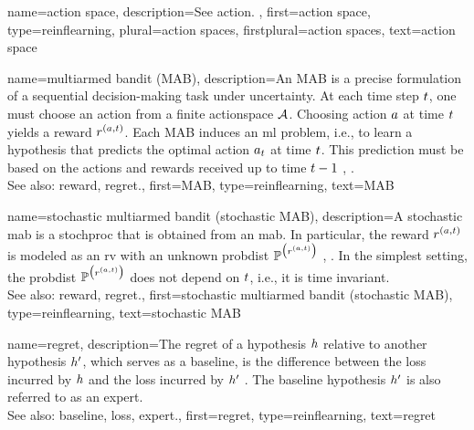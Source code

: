 {name={action space},
	description={See \gls{action}.} ,
	first={action space},
	type=reinflearning,
	plural={action spaces},
	firstplural={action spaces},
	text={action space}
}

{name={multiarmed bandit (MAB)},
	description={An MAB is a precise 
		formulation of a sequential decision-making task under \gls{uncertainty}. 
		At each time step $t$, one must choose an \gls{action} from a finite 
		\gls{actionspace} $\mathcal{A}$. Choosing \gls{action} 
		$a$ at time $t$ yields a \gls{reward} $r^{(a,t)}$. 
		Each MAB induces an \gls{ml} problem, i.e., to learn a \gls{hypothesis} that 
		predicts the optimal \gls{action} $a_{t}$ at time $t$. 
		This \gls{prediction} must be based on the \glspl{action} 
		and \glspl{reward} received up to time $t-1$ 
		\cite{SuttonEd2}, \cite{Bubeck2012}.
			\\ 
		See also: \gls{reward}, \gls{regret}.},
	first={MAB},
	type=reinflearning,
	text={MAB}
}

{name={stochastic multiarmed bandit (stochastic MAB)},
	description={A stochastic \gls{mab} 
		is a \gls{stochproc} that is obtained from an \gls{mab}. In particular, 
		the \gls{reward} $r^{(a,t)}$ is modeled as an \gls{rv}		 
		with an unknown \gls{probdist} $\mathbb{P}^{\big(r^{(a,t)}\big)}$ 
		\cite{HazanOCO}, \cite{Bubeck2012}. 
		In the simplest setting, the \gls{probdist} $\mathbb{P}^{\big(r^{(a,t)}\big)}$ 
		does not depend on $t$, i.e., it is time invariant. 
		\\ 
		See also: \gls{reward}, \gls{regret}.},
	first={stochastic multiarmed bandit (stochastic MAB)},
	type=reinflearning,
	text={stochastic MAB}
}

{name={regret},
	description={The regret of a \gls{hypothesis} $h$ relative to 
		another \gls{hypothesis} $h'$, which serves as a \gls{baseline}, 
		is the difference between the \gls{loss} incurred by $h$ and the \gls{loss} 
		incurred by $h'$ \cite{PredictionLearningGames}. 
		The \gls{baseline} \gls{hypothesis} $h'$ is also referred to as an \gls{expert}.
					\\ 
		See also: \gls{baseline}, \gls{loss}, \gls{expert}.},
	first={regret},
	type=reinflearning,
	text={regret} 
}